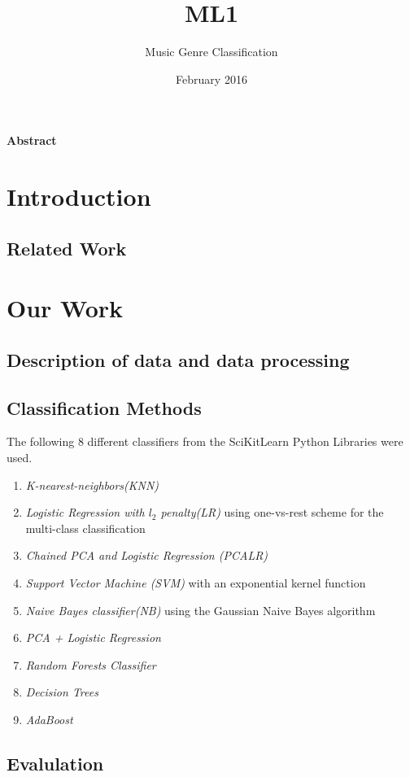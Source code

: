 \documentclass{article}
\title{ML1}
\author{Music Genre Classification}
\date{February 2016}
\begin{document}
\maketitle

\textbf{Abstract}

\section{Introduction}
\subsection{Related Work}

\section{Our Work}
\subsection{Description of data and data processing}

\subsection{Classification Methods}

The following 8 different classifiers from the SciKitLearn Python Libraries were used. 
\begin{enumerate}
    \item \textit{K-nearest-neighbors(KNN)} 
    \item \textit{Logistic Regression with $l_2$ penalty(LR)} using one-vs-rest scheme for the multi-class classification
    \item \textit{Chained PCA and Logistic Regression (PCALR)}
    \item \textit{Support Vector Machine (SVM)} with an exponential kernel function
    \item \textit{Naive Bayes classifier(NB)} using the Gaussian Naive Bayes algorithm
    \item \textit{PCA + Logistic Regression}
    \item \textit{Random Forests Classifier}
    \item \textit{Decision Trees} 
    \item \textit{AdaBoost}
\end{enumerate}

\subsection{Evalulation}
\end{document}
